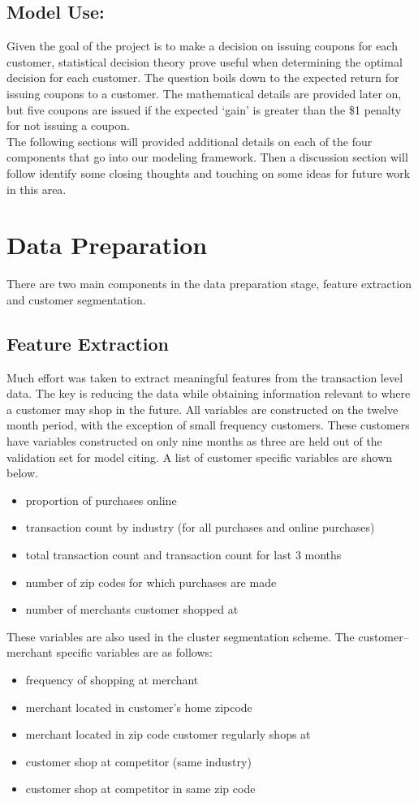 \documentclass[12pt]{article} %
\begin{document}
\subsection*{Model Use:} 
Given the goal of the project is to make a decision on issuing coupons for each customer, statistical decision theory prove useful when determining the optimal decision for each customer.  The question boils down to the expected return for issuing coupons to a customer.  The mathematical details are provided later on, but five coupons are issued if the expected `gain' is greater than the \$1 penalty for not issuing a coupon.\\

The following sections will provided additional details on each of the four components that go into our modeling framework.  Then a discussion section will follow identify some closing thoughts and touching on some ideas for future work in this area. 
\section{Data Preparation}
There are two main components in the data preparation stage, feature extraction and customer segmentation.
\subsection{Feature Extraction}
Much effort was taken to extract meaningful features from the transaction level data.  The key is reducing the data while obtaining information relevant to where a customer may shop in the future.  All variables are constructed on the twelve month period, with the exception of small frequency customers.  These customers have variables constructed on only nine months as three are held out of the validation set for model citing.  A list of customer specific variables are shown below.
\small
\begin{itemize}
\item proportion of purchases online 
\item transaction count by industry (for all purchases and online purchases)
\item total transaction count and transaction count for last 3 months
\item number of zip codes for which purchases are made
\item number of merchants customer shopped at
\end{itemize}
\normalsize
These variables are also used in the cluster segmentation scheme.   The customer-- merchant specific variables are as follows:
\small
\begin{itemize}
\item frequency of shopping at merchant
\item merchant located in customer's home zipcode
\item merchant located in zip code customer regularly shops at
\item customer shop at competitor (same industry)
\item customer shop at competitor in same zip code
\end{itemize}
\normalsize
\end{document}
